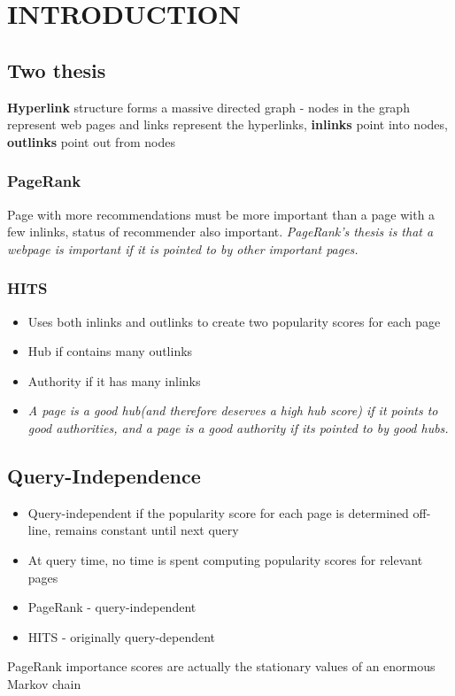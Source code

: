 \documentclass[11pt]{report}
\begin{document}

\chapter{INTRODUCTION}
\section{Two thesis}
\textbf{Hyperlink} structure forms a massive directed graph - nodes in the graph represent web pages and links represent the hyperlinks, \textbf{inlinks} point into nodes, \textbf{outlinks} point out from nodes
\subsection{PageRank}
Page with more recommendations must be more important than a page with a few inlinks, status of recommender also important. \textit{PageRank's thesis is that a webpage is important if it is pointed to by other important pages.}
\subsection{HITS}
\begin{itemize}
\item Uses both inlinks and outlinks to create two popularity scores for each page
\item Hub if contains many outlinks
\item Authority if it has many inlinks
\item \textit{A page is a good hub(and therefore deserves a high hub score) if it points to good authorities, and a page is a good authority if its pointed to by good hubs.}
\end{itemize}
\section{Query-Independence}
\begin{itemize}
\item Query-independent if the popularity score for each page is determined off-line, remains constant until next query
\item At query time, no time is spent computing popularity scores for relevant pages
\item PageRank - query-independent
\item HITS - originally query-dependent
\end{itemize}
PageRank importance scores are actually the stationary values of an enormous Markov chain
\end{document}
